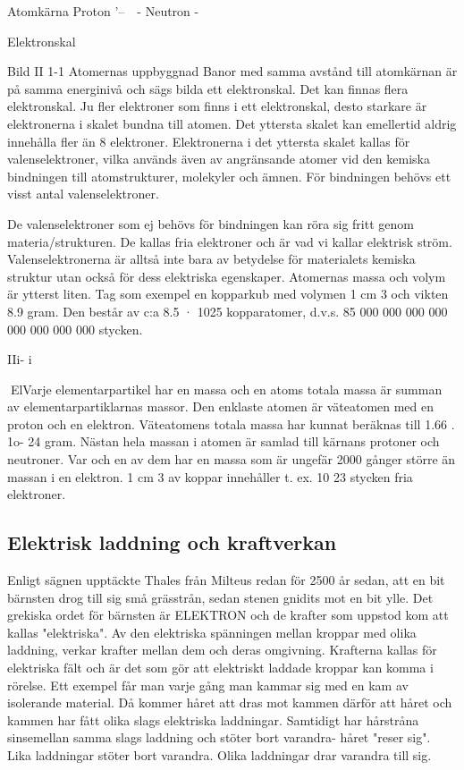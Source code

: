 Atomkärna
Proton
'--\-~~- Neutron
-

Elektronskal

Bild II 1-1 Atomernas uppbyggnad
Banor med samma avstånd till atomkärnan är på samma energinivå och sägs bilda
ett elektronskal.
Det kan finnas flera elektronskal. Ju fler
elektroner som finns i ett elektronskal, desto
starkare är elektronerna i skalet bundna till
atomen. Det yttersta skalet kan emellertid
aldrig innehålla fler än 8 elektroner.
Elektronerna i det yttersta skalet kallas
för valenselektroner, vilka används även av
angränsande atomer vid den kemiska bindningen till atomstrukturer, molekyler och
ämnen. För bindningen behövs ett visst
antal valenselektroner.

De valenselektroner som ej behövs för
bindningen kan röra sig fritt genom materia/strukturen. De kallas fria elektroner och är vad vi kallar elektrisk ström.
Valenselektronerna är alltså inte bara av
betydelse för materialets kemiska struktur
utan också för dess elektriska egenskaper.
Atomernas massa och volym är ytterst
liten. Tag som exempel en kopparkub med
volymen 1 cm 3 och vikten 8.9 gram. Den
består av c:a 8.5 · 1025 kopparatomer, d.v.s.
85 000 000 000 000 000 000 000 000
stycken.

IIi- i

ElVarje elementarpartikel har en massa och
en atoms totala massa är summan av
elementarpartiklarnas massor. Den enklaste
atomen är väteatomen med en proton och
en elektron. Väteatomens totala massa har
kunnat beräknas till 1.66 . 1o- 24 gram.
Nästan hela massan i atomen är samlad
till kärnans protoner och neutroner. Var och
en av dem har en massa som är ungefär
2000 gånger större än massan i en elektron.
1 cm 3 av koppar innehåller t. ex. 10 23 stycken
fria elektroner.

\subsection{Elektrisk laddning och kraftverkan}

Enligt sägnen upptäckte Thales från Milteus
redan för 2500 år sedan, att en bit bärnsten
drog till sig små grässtrån, sedan stenen
gnidits mot en bit ylle. Det grekiska ordet för
bärnsten är ELEKTRON och de krafter som
uppstod kom att kallas "elektriska". Av den
elektriska spänningen mellan kroppar med
olika laddning, verkar krafter mellan dem
och deras omgivning. Krafterna kallas för
elektriska fält och är det som gör att elektriskt
laddade kroppar kan komma i rörelse.
Ett exempel får man varje gång man
kammar sig med en kam av isolerande material. Då kommer håret att dras mot kammen därför att håret och kammen har fått
olika slags elektriska laddningar. Samtidigt
har hårstråna sinsemellan samma slags laddning och stöter bort varandra- håret "reser
sig".
Lika laddningar stöter bort varandra.
Olika laddningar drar varandra till sig.

